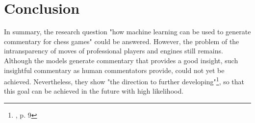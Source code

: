 \section{Conclusion}

In summary, the research question "how machine learning can be used to generate commentary for chess games" could be answered. However, the problem of the intransparency of moves of professional players and engines still remains. Although the models generate commentary that provides a good insight, such insightful commentary as human commentators provide, could not yet be achieved. Nevertheless, they show "the direction to further developing"\footnote{\cite{zang-etal-2019-automated}, p. 9}, so that this goal can be achieved in the future with high likelihood. 